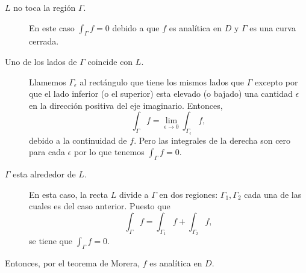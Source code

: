 \documentclass[11pt,letter]{article}
\begin{document}
\begin{description}
	\item[$L$ no toca la región $\Gamma$.] En este caso
	$\int_\Gamma f=0$ debido a que $f$ es analítica en $D$ y
	$\Gamma$ es una curva cerrada.

	\item[Uno de los lados de $\Gamma$ coincide con $L$.]
	Llamemos $\Gamma_\epsilon$ al rectángulo que tiene los mismos
	lados que $\Gamma$ excepto por que el lado inferior (o el superior)
	esta elevado (o bajado) una cantidad $\epsilon$ en la dirección positiva del
	eje imaginario. Entonces,
	\[\int_\Gamma f = \lim_{\epsilon\to0} \int_{\Gamma_\epsilon} f,\]
	debido a la continuidad de $f$. Pero las integrales de la derecha son
	cero para cada $\epsilon$ por lo que tenemos $\int_\Gamma f=0$.

	\item[$\Gamma$ esta alrededor de $L$.] En esta caso, la recta
	$L$ divide a $\Gamma$ en dos regiones: $\Gamma_1,\Gamma_2$ cada una de
	las cuales es del caso anterior. Puesto que
	\[\int_\Gamma f=\int_{\Gamma_1} f + \int_{\Gamma_2} f,\]
	se tiene que $\int_\Gamma f=0$.
\end{description}

Entonces, por el teorema de Morera, $f$ es analítica en $D$.



\end{document}
